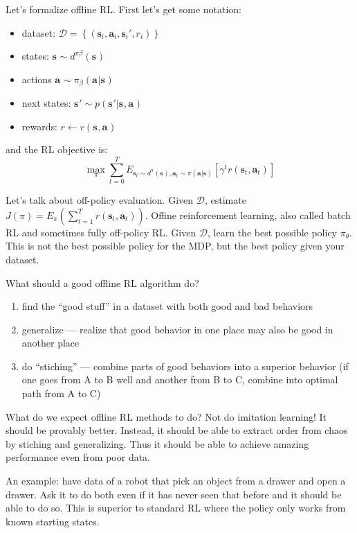 \documentclass{report}
\begin{document}
Let's formalize offline RL. First let's get some notation:
\begin{itemize}
		\item dataset: $ \mathcal{D} = \left\{ \left( \bm{s}_{i}, \bm{a}_{i}, \bm{s}_{i}', r_i \right)  \right\}   $
		\item states: $ \bm{s}_{} \sim d^{\pi \beta}(\bm{s}_{})  $
		\item actions $ \bm{a}_{} \sim \pi_\beta(\bm{a}_{}|\bm{s}_{})$
		\item next states: $ \bm{s}_{}' \sim p(\bm{s}_{}'|\bm{s}_{}, \bm{a}_{})$
		\item rewards: $r \leftarrow r(\bm{s}_{}, \bm{a}_{})$
\end{itemize}
and the RL objective is:
\begin{equation}
		\max_\pi \sum_{t=0}^{T} E_{\bm{s}_{t} \sim d^\pi(\bm{s}_{}), \bm{a}_{t} \sim \pi(\bm{a}_{}|\bm{s}_{})} \left[ \gamma^t r (\bm{s}_{t}, \bm{a}_{t} ) \right] 
\end{equation}

Let's talk about off-policy evaluation.
Given $ \mathcal{D} $, estimate $ J(\pi) = E_{\pi} \left( \sum_{t=1}^{T} r (\bm{s}_{t}, \bm{a}_{t} ) \right)  $.
Offine reinforcement learning, also called batch RL and sometimes fully off-policy RL.
Given $ \mathcal{D} $, learn the best possible policy $ \pi_\theta $.
This is not the best possible policy for the MDP, but the best policy given your dataset.

What should a good offline RL algorithm do?
\begin{enumerate}
		\item find the ``good stuff'' in a dataset with both good and bad behaviors
		\item generalize --- realize that good behavior in one place may also be good in another place
		\item do ``stiching'' --- combine parts of good behaviors into a superior behavior 
				(if one goes from A to B well and another from B to C, combine into optimal path from A to C)
\end{enumerate}

What do we expect offline RL methods to do?
Not do imitation learning! It should be provably better.
Instead, it should be able to extract order from chaos by stiching and generalizing.
Thus it should be able to achieve amazing performance even from poor data.

An example: have data of a robot that pick an object from a drawer and open a drawer.
Ask it to do both even if it has never seen that before and it should be able to do so.
This is superior to standard RL where the policy only works from known starting states.
\end{document}
